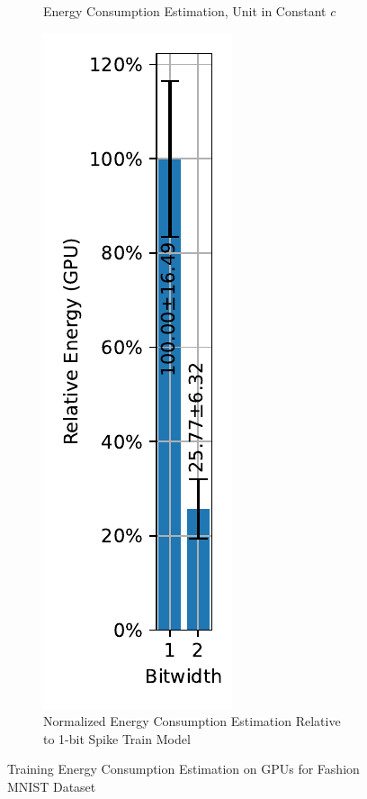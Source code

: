 \begin{figure}[H]
\begin{subfigure}[H]{0.48\textwidth}
                \caption{Energy Consumption Estimation, Unit in Constant $c$}
            \end{subfigure}
            \hfill
            \begin{subfigure}[H]{0.48\textwidth}
                \includegraphics[width=\textwidth]{../timesteps/FashionMNIST/plots/fashionmnist_train_relative_energy_gpu.pdf}
                \caption{Normalized Energy Consumption Estimation Relative to 1-bit Spike Train Model}
            \end{subfigure}
            \caption{Training Energy Consumption Estimation on GPUs for Fashion MNIST Dataset}
        \end{figure}

